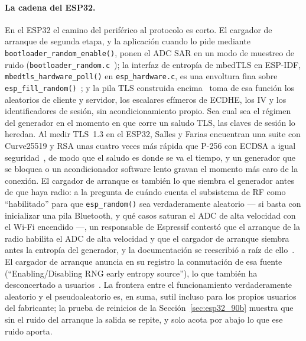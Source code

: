 {\sloppy
\paragraph{La cadena del ESP32.} En el ESP32 el camino del periférico al
protocolo es corto. El cargador de arranque de segunda etapa, y la
aplicación cuando lo pide mediante \texttt{bootloader\_\allowbreak{}random\_\allowbreak{}enable()},
ponen el ADC SAR en un modo de muestreo de ruido
(\texttt{bootloader\_\allowbreak{}random.c}~\cite{espressif_bootloader_random}); la
interfaz de entropía de mbedTLS en ESP-IDF,
\texttt{mbedtls\_\allowbreak{}hardware\_\allowbreak{}poll()} en \texttt{esp\_\allowbreak{}hardware.c}, es una
envoltura fina sobre \texttt{esp\_\allowbreak{}fill\_\allowbreak{}random()}~\cite{espressif_esp_hardware};
y la pila TLS construida encima~\cite{espressif_mbedtls} toma de esa
función los aleatorios de cliente y servidor, los escalares efímeros de
ECDHE, los IV y los identificadores de sesión, sin acondicionamiento
propio. Sea cual sea el régimen del generador en el momento en que corre
un saludo TLS, las claves de sesión lo heredan. Al medir TLS~1.3 en el
ESP32, Salles y Farias encuentran una suite con Curve25519 y RSA unas
cuatro veces más rápida que P-256 con ECDSA a igual
seguridad~\cite{salles_2023_iotst}, de modo que el saludo es donde se va
el tiempo, y un generador que se bloquea o un acondicionador software
lento gravan el momento más caro de la conexión. El cargador de arranque
es también lo que siembra el generador antes de que haya radio: a la
pregunta de cuándo cuenta el subsistema de RF como ``habilitado'' para
que \texttt{esp\_\allowbreak{}random()} sea verdaderamente aleatorio --- si basta con
inicializar una pila Bluetooth, y qué casos saturan el ADC de alta
velocidad con el Wi-Fi encendido ---, un responsable de Espressif contestó
que el arranque de la radio habilita el ADC de alta velocidad y que el
cargador de arranque siembra antes la entropía del generador, y la
documentación se reescribió a raíz de ello~\cite{espressif_issue_14665}.
El cargador de arranque anuncia en su registro la conmutación de esa
fuente (``Enabling\slash Disabling RNG early entropy source''), lo que también
ha desconcertado a usuarios~\cite{espressif_issue_7598}. La frontera
entre el funcionamiento verdaderamente aleatorio y el pseudoaleatorio es,
en suma, sutil incluso para los propios usuarios del fabricante; la
prueba de reinicios de la Sección~\ref{sec:esp32_90b} muestra que sin el
ruido del arranque la salida se repite, y solo acota por abajo lo que ese
ruido aporta.\par}

